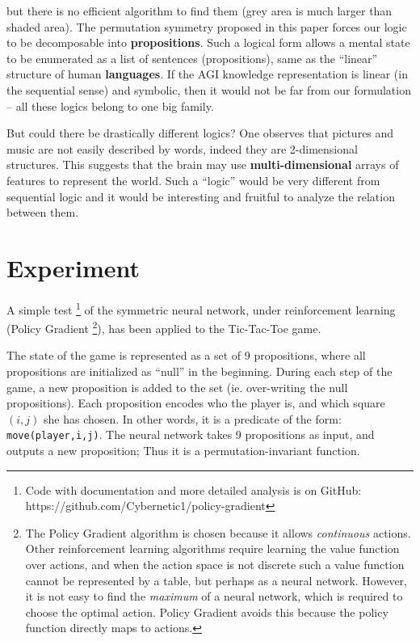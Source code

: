 \documentclass[orivec]{llncs}
\begin{document}
but there is no efficient algorithm to find them (grey area is much larger than shaded area).  The permutation symmetry proposed in this paper forces our logic to be decomposable into \textbf{propositions}.  Such a logical form allows a mental state to be enumerated as a list of sentences (propositions), same as the ``linear'' structure of human \textbf{languages}.  If the AGI knowledge representation is linear (in the sequential sense) and symbolic, then it would not be far from our formulation -- all these logics belong to one big family.

But could there be drastically different logics?  One observes that pictures and music are not easily described by words, indeed they are 2-dimensional structures.  This suggests that the brain may use \textbf{multi-dimensional} arrays of features to represent the world.  Such a ``logic'' would be very different from sequential logic and it would be interesting and fruitful to analyze the relation between them.

\section{Experiment}
\label{sec:experiment}

A simple test \footnote{ Code with documentation and more detailed analysis is on GitHub: https://github.com/Cybernetic1/policy-gradient } of the symmetric neural network, under reinforcement learning (Policy Gradient \footnote{The Policy Gradient algorithm is chosen because it allows \textit{continuous} actions.  Other reinforcement learning algorithms require learning the value function over actions, and when the action space is not discrete such a value function cannot be represented by a table, but perhaps as a neural network.  However, it is not easy to find the \textit{maximum} of a neural network, which is required to choose the optimal action.  Policy Gradient avoids this because the policy function directly maps to actions.}), has been applied to the Tic-Tac-Toe game.

The state of the game is represented as a set of 9 propositions, where all propositions are initialized as ``null'' in the beginning.  During each step of the game, a new proposition is added to the set (ie. over-writing the null propositions).  Each proposition encodes who the player is, and which square $(i,j)$ she has chosen.  In other words, it is a predicate of the form: \texttt{move(player,i,j)}.  The neural network takes 9 propositions as input, and outputs a new proposition;  Thus it is a permutation-invariant function.
\end{document}
